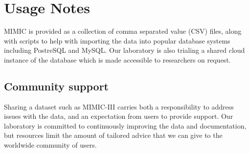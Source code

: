 \documentclass[english]{article}
\begin{document}

\section*{Usage Notes}



MIMIC is provided as a collection of comma separated value (CSV) files, along with scripts to help with importing the data into popular database systems including PostreSQL and MySQL. Our laboratory is also trialing a shared cloud instance of the database which is made accessible to researchers on request. 

\subsection*{Community support}

Sharing a dataset such as MIMIC-III carries both a responsibility to address issues with the data, and an expectation from users to provide support. Our laboratory is committed to continuously improving the data and documentation, but resources limit the amount of tailored advice that we can give to the worldwide community of users.
\end{document}
